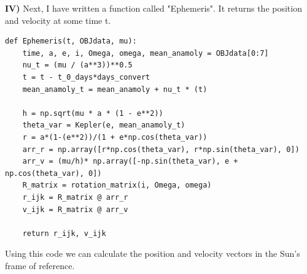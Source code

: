 \documentclass[12pt,twocolumn]{article}  %
\begin{document}
\textbf{IV)} Next, I have written a function called "Ephemeris". It returns the position and velocity at some time t.
\begin{lstlisting}
def Ephemeris(t, OBJdata, mu):
    time, a, e, i, Omega, omega, mean_anamoly = OBJdata[0:7]
    nu_t = (mu / (a**3))**0.5
    t = t - t_0_days*days_convert
    mean_anamoly_t = mean_anamoly + nu_t * (t)

    h = np.sqrt(mu * a * (1 - e**2))
    theta_var = Kepler(e, mean_anamoly_t)
    r = a*(1-(e**2))/(1 + e*np.cos(theta_var))
    arr_r = np.array([r*np.cos(theta_var), r*np.sin(theta_var), 0])
    arr_v = (mu/h)* np.array([-np.sin(theta_var), e + np.cos(theta_var), 0])
    R_matrix = rotation_matrix(i, Omega, omega)
    r_ijk = R_matrix @ arr_r
    v_ijk = R_matrix @ arr_v
    
    return r_ijk, v_ijk
\end{lstlisting}

\noindent Using this code we can calculate the position and velocity vectors in the Sun's frame of reference. 
\end{document}
